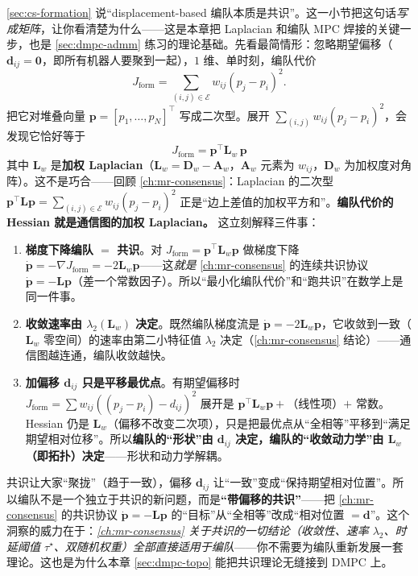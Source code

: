 \cref{sec:cs-formation} 说“displacement-based 编队本质是共识”。这一小节把这句话\emph{写成矩阵}，让你看清楚为什么——这是本章把 Laplacian 和编队 MPC 焊接的关键一步，也是 \cref{sec:dmpc-admm} 练习的理论基础。先看最简情形：忽略期望偏移（$\mathbf{d}_{ij}=\mathbf{0}$，即所有机器人要聚到一起），$1$ 维、单时刻，编队代价
\begin{equation}
  J_{\text{form}}=\sum_{(i,j)\in\mathcal{E}}w_{ij}(p_j-p_i)^2.
  \label{eq:dmpc-form-scalar}
\end{equation}
把它对堆叠向量 $\mathbf{p}=[p_1,\dots,p_N]^\top$ 写成二次型。展开 $\sum_{(i,j)}w_{ij}(p_j-p_i)^2$，会发现它恰好等于
\begin{equation}
  \boxed{\ J_{\text{form}}=\mathbf{p}^\top \mathbf{L}_w\,\mathbf{p}\ }
  \label{eq:dmpc-form-laplacian}
\end{equation}
其中 $\mathbf{L}_w$ 是\textbf{加权 Laplacian}（$\mathbf{L}_w=\mathbf{D}_w-\mathbf{A}_w$，$\mathbf{A}_w$ 元素为 $w_{ij}$，$\mathbf{D}_w$ 为加权度对角阵）。这不是巧合——回顾 \cref{ch:mr-consensus}：Laplacian 的二次型 $\mathbf{p}^\top\mathbf{L}\mathbf{p}=\sum_{(i,j)\in\mathcal{E}}w_{ij}(p_j-p_i)^2$ 正是“边上差值的加权平方和”。\textbf{编队代价的 Hessian 就是通信图的加权 Laplacian。} 这立刻解释三件事：
\begin{enumerate}
  \item \textbf{梯度下降编队 $=$ 共识}。对 $J_{\text{form}}=\mathbf{p}^\top \mathbf{L}_w\mathbf{p}$ 做梯度下降 $\dot{\mathbf{p}}=-\nabla J_{\text{form}}=-2\mathbf{L}_w\mathbf{p}$——这\emph{就是} \cref{ch:mr-consensus} 的连续共识协议 $\dot{\mathbf{p}}=-\mathbf{L}\mathbf{p}$（差一个常数因子）。所以“最小化编队代价”和“跑共识”在数学上是同一件事。
  \item \textbf{收敛速率由 $\lambda_2(\mathbf{L}_w)$ 决定}。既然编队梯度流是 $\dot{\mathbf{p}}=-2\mathbf{L}_w\mathbf{p}$，它收敛到一致（$\mathbf{L}_w$ 零空间）的速率由第二小特征值 $\lambda_2$ 决定（\cref{ch:mr-consensus} 结论）——通信图越连通，编队收敛越快。
  \item \textbf{加偏移 $\mathbf{d}_{ij}$ 只是平移最优点}。有期望偏移时 $J_{\text{form}}=\sum w_{ij}((p_j-p_i)-d_{ij})^2$ 展开是 $\mathbf{p}^\top \mathbf{L}_w\mathbf{p}+$（线性项）$+$ 常数。Hessian 仍是 $\mathbf{L}_w$（偏移不改变二次项），只是把最优点从“全相等”平移到“满足期望相对位移”。所以\textbf{编队的“形状”由 $\mathbf{d}_{ij}$ 决定，编队的“收敛动力学”由 $\mathbf{L}_w$（即拓扑）决定}——形状和动力学解耦。
\end{enumerate}

\begin{insight}[编队控制 $=$ 共识 $+$ 偏移]\label{ins:dmpc-form-eq-consensus}
共识让大家“聚拢”（趋于一致），偏移 $\mathbf{d}_{ij}$ 让“一致”变成“保持期望相对位置”。所以编队不是一个独立于共识的新问题，而是\textbf{“带偏移的共识”}——把 \cref{ch:mr-consensus} 的共识协议 $\dot{\mathbf{p}}=-\mathbf{L}\mathbf{p}$ 的“目标”从“全相等”改成“相对位置 $=\mathbf{d}$”。这个洞察的威力在于：\emph{\cref{ch:mr-consensus} 关于共识的一切结论（收敛性、速率 $\lambda_2$、时延阈值 $\tau^\star$、双随机权重）全部直接适用于编队}——你不需要为编队重新发展一套理论。这也是为什么本章 \cref{sec:dmpc-topo} 能把共识理论无缝接到 DMPC 上。
\end{insight}

